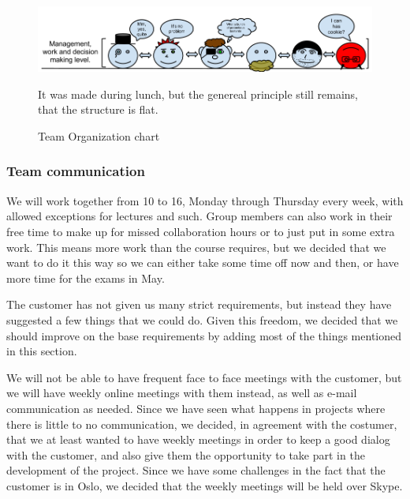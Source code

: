 \documentclass[12pt]{article}
\begin{document}
    \begin{figure}[h]
        \centering
        \includegraphics[scale=0.5]{TeamOrganizationchart}
        \caption{Team Organization chart}
        It was made during lunch, but the genereal principle still remains, that the structure is flat.
        \label{fig:teamOrgchart}
    \end{figure}
    
    
    
    \subsubsection {Team communication}
    We will work together from 10 to 16, Monday through Thursday every week, with allowed exceptions for lectures and such. Group members can also work in their free time to make up for missed collaboration hours or to just put in some extra work. This means more work than the course requires, but we decided that we want to do it this way so we can either take some time off now and then, or have more time for the exams in May.

    The customer has not given us many strict requirements, but instead they have suggested a few things that we could do. Given this freedom, we decided that we should improve on the base requirements by adding most of the things mentioned in this section.
    
    We will not be able to have frequent face to face meetings with the customer, but we will have weekly online meetings with them instead, as well as e-mail communication as needed. Since we have seen what happens in projects where there is little to no communication, we decided, in agreement with the costumer, that we at least wanted to have weekly meetings in order  to keep a good dialog with the customer, and also give them the opportunity to take part in the development of the project. Since we have some challenges in the fact that the customer is in Oslo, we decided that the weekly meetings will be held over Skype.
    
\end{document}
